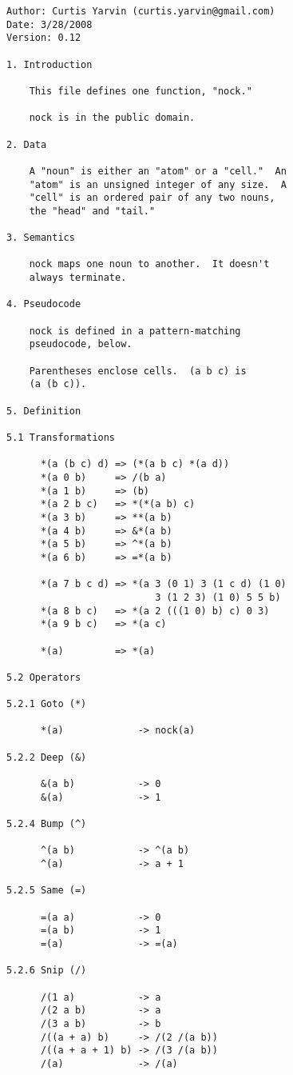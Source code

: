 \documentclass[twoside]{article}
\begin{document}
\begin{lstlisting}[label=lst:nock12k,caption={Nock 12K, 2008.},style=listingcode]
Author: Curtis Yarvin (curtis.yarvin@gmail.com)
Date: 3/28/2008
Version: 0.12

1. Introduction

    This file defines one function, "nock."

    nock is in the public domain.

2. Data

    A "noun" is either an "atom" or a "cell."  An
    "atom" is an unsigned integer of any size.  A
    "cell" is an ordered pair of any two nouns,
    the "head" and "tail."

3. Semantics

    nock maps one noun to another.  It doesn't
    always terminate.

4. Pseudocode

    nock is defined in a pattern-matching
    pseudocode, below.

    Parentheses enclose cells.  (a b c) is
    (a (b c)).

5. Definition

5.1 Transformations

      *(a (b c) d) => (*(a b c) *(a d))
      *(a 0 b)     => /(b a)
      *(a 1 b)     => (b)
      *(a 2 b c)   => *(*(a b) c)
      *(a 3 b)     => **(a b)
      *(a 4 b)     => &*(a b)
      *(a 5 b)     => ^*(a b)
      *(a 6 b)     => =*(a b)

      *(a 7 b c d) => *(a 3 (0 1) 3 (1 c d) (1 0)
                          3 (1 2 3) (1 0) 5 5 b)
      *(a 8 b c)   => *(a 2 (((1 0) b) c) 0 3)
      *(a 9 b c)   => *(a c)

      *(a)         => *(a)

5.2 Operators

5.2.1 Goto (*)

      *(a)             -> nock(a)

5.2.2 Deep (&)

      &(a b)           -> 0
      &(a)             -> 1

5.2.4 Bump (^)

      ^(a b)           -> ^(a b)
      ^(a)             -> a + 1

5.2.5 Same (=)

      =(a a)           -> 0
      =(a b)           -> 1
      =(a)             -> =(a)

5.2.6 Snip (/)

      /(1 a)           -> a
      /(2 a b)         -> a
      /(3 a b)         -> b
      /((a + a) b)     -> /(2 /(a b))
      /((a + a + 1) b) -> /(3 /(a b))
      /(a)             -> /(a)
\end{lstlisting}
\end{document}
